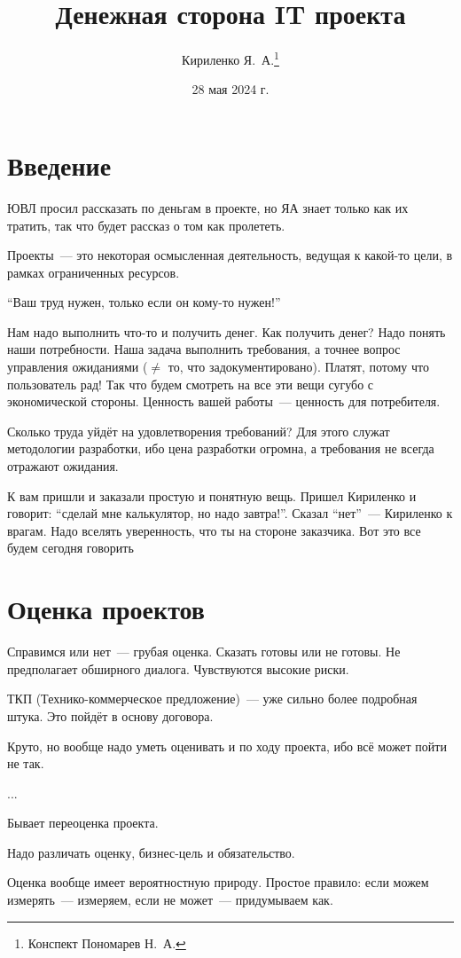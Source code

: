 \documentclass[12pt, a4paper, oneside]{memoir}
\title{Денежная сторона IT проекта}
\author{Кириленко Я.~А.\thanks{Конспект Пономарев Н.~А.}}
\date{28 мая 2024 г.}
\begin{document}
\maketitle

\section*{Введение}
ЮВЛ просил рассказать по деньгам в проекте, но ЯА знает только как их тратить, так что будет рассказ о том как пролететь.

Проекты~--- это некоторая осмысленная деятельность, ведущая к какой-то цели, в рамках ограниченных ресурсов.

\enquote{Ваш труд нужен, только если он кому-то нужен!}

Нам надо выполнить что-то и получить денег.
Как получить денег?
Надо понять наши потребности.
Наша задача выполнить требования, а точнее вопрос управления ожиданиями ($\neq$ то, что задокументировано).
Платят, потому что пользователь рад!
Так что будем смотреть на все эти вещи сугубо с экономической стороны.
Ценность вашей работы~--- ценность для потребителя.

Сколько труда уйдёт на удовлетворения требований?
Для этого служат методологии разработки, ибо цена разработки огромна, а требования не всегда отражают ожидания.

К вам пришли и заказали простую и понятную вещь.
Пришел Кириленко и говорит: \enquote{сделай мне калькулятор, но надо завтра!}.
Сказал \enquote{нет}~--- Кириленко к врагам.
Надо вселять уверенность, что ты на стороне заказчика.
Вот это все будем сегодня говорить

\section*{Оценка проектов}

Справимся или нет~--- грубая оценка.
Сказать готовы или не готовы.
Не предполагает обширного диалога.
Чувствуются высокие риски.

ТКП (Технико-коммерческое предложение)~--- уже сильно более подробная штука.
Это пойдёт в основу договора.

Круто, но вообще надо уметь оценивать и по ходу проекта, ибо всё может пойти не так.

...

Бывает переоценка проекта.

Надо различать оценку, бизнес-цель и обязательство.

Оценка вообще имеет вероятностную природу.
Простое правило: если можем измерять~--- измеряем, если не может~--- придумываем как.
\end{document}

